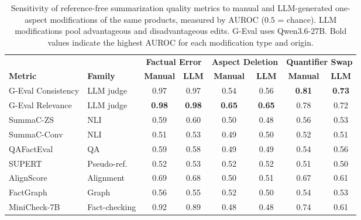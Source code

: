 \begin{table}[t]
\centering
\small
\setlength{\tabcolsep}{6pt}
\renewcommand{\arraystretch}{1.12}
\caption{Sensitivity of reference-free summarization quality metrics to manual and LLM-generated one-aspect modifications of the same products, measured by AUROC ($0.5$ = chance). LLM modifications pool advantageous and disadvantageous edits. G-Eval uses Qwen3.6-27B. Bold values indicate the highest AUROC for each modification type and origin.}
\label{tab:metric_comparison}
\begin{tabular}{llcccccc}
\toprule
& 
& \multicolumn{2}{c}{\textbf{Factual Error}}
& \multicolumn{2}{c}{\textbf{Aspect Deletion}}
& \multicolumn{2}{c}{\textbf{Quantifier Swap}} \\
\cmidrule(lr){3-4}
\cmidrule(lr){5-6}
\cmidrule(l){7-8}
\textbf{Metric} & \textbf{Family}
& \textbf{Manual} & \textbf{LLM}
& \textbf{Manual} & \textbf{LLM}
& \textbf{Manual} & \textbf{LLM} \\
\midrule

G-Eval Consistency & LLM judge
& 0.97 & 0.97 & 0.54 & 0.56 & \textbf{0.81} & \textbf{0.73} \\
G-Eval Relevance & LLM judge
& \textbf{0.98} & \textbf{0.98} & \textbf{0.65} & \textbf{0.65} & 0.78 & 0.72 \\
SummaC-ZS & NLI
& 0.59 & 0.60 & 0.50 & 0.48 & 0.56 & 0.53 \\
SummaC-Conv & NLI
& 0.51 & 0.53 & 0.49 & 0.50 & 0.52 & 0.51 \\
QAFactEval & QA
& 0.59 & 0.58 & 0.49 & 0.49 & 0.54 & 0.56 \\
SUPERT & Pseudo-ref.
& 0.52 & 0.53 & 0.52 & 0.52 & 0.51 & 0.50 \\
AlignScore & Alignment
& 0.69 & 0.68 & 0.50 & 0.51 & 0.67 & 0.61 \\
FactGraph & Graph
& 0.56 & 0.55 & 0.52 & 0.50 & 0.54 & 0.53 \\
MiniCheck-7B & Fact-checking
& 0.92 & 0.89 & 0.48 & 0.48 & 0.74 & 0.61 \\

\bottomrule
\end{tabular}
\end{table}
